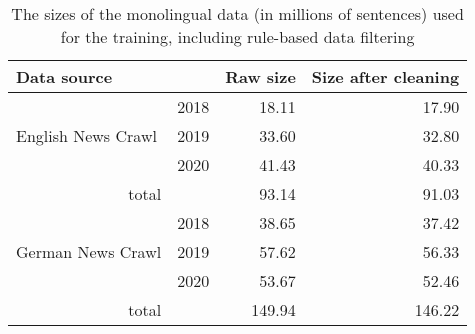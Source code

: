 \begin{table}
  \centering
  \begin{tabular}{llrr}
    \toprule
    \multicolumn{2}{l}{Data source}  & Raw size  & Size after cleaning \\
    \midrule
    \multirow{3}{*}{English News Crawl} & 2018 & 18.11 & 17.90 \\
                                     & 2019 & 33.60 & 32.80 \\
                                     & 2020 & 41.43 & 40.33 \\
    \multicolumn{1}{r}{total} & & 93.14 & 91.03 \\
    \midrule
    \multirow{3}{*}{German News Crawl} & 2018 & 38.65 & 37.42  \\
                                     & 2019 & 57.62 & 56.33  \\
                                     & 2020 & 53.67 & 52.46 \\
    \multicolumn{1}{r}{total} & & 149.94 & 146.22 \\
    \bottomrule
  \end{tabular}

  \caption{The sizes of the monolingual data (in millions of sentences) used
    for the training, including rule-based data filtering}%
  \label{tab:mono-data-sizes}
\end{table}



